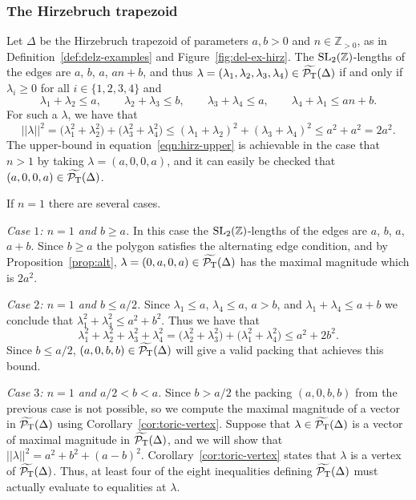\documentclass[10pt,a4paper]{amsart}
\numberwithin{equation}{section}
\def\Z{{\mathbb Z}}
\newcommand{\De}{\Delta}
\newcommand{\PT}{\mathcal{P}_{\rm T}}
\newcommand{\PTtilde}{\widetilde{\PT}}
\newcommand{\SL}{{\rm SL}_2(\Z)}
\theoremstyle{definition}
\theoremstyle{plain}
\theoremstyle{plain}
\begin{document}
\subsubsection{The Hirzebruch trapezoid}
\label{sec:hirz-packing}
Let $\De$ be the Hirzebruch trapezoid of parameters $a,b>0$ and $n\in \Z_{>0}$, as in Definition~\ref{def:delz-examples} and Figure~\ref{fig:del-ex-hirz}.
The $\SL$-lengths of the edges are $a$, $b$, $a$, $an+b$, and thus $\lambda = (\lambda_1,\lambda_2,\lambda_3,\lambda_4)\in\PTtilde(\De)$ if and only if $\lambda_i\geq 0$ for all $i\in\{1,2,3,4\}$ and
\begin{equation}\label{eqn:hirz-inequalities}
 \lambda_1+\lambda_2 \leq a,\qquad
 \lambda_2+\lambda_3 \leq b,\qquad
 \lambda_3+\lambda_4 \leq a,\qquad
 \lambda_4+\lambda_1 \leq an+b.
\end{equation}
For such a $\lambda$, we have that
\begin{equation}\label{eqn:hirz-upper}
 ||\lambda||^2 = \big(\lambda_1^2 + \lambda_2^2\big) + \big(\lambda_3^2 + \lambda_4^2\big) \leq (\lambda_1 + \lambda_2)^2 + (\lambda_3 + \lambda_4)^2 \leq a^2 + a^2 = 2a^2.
\end{equation}
The upper-bound in equation~\eqref{eqn:hirz-upper} is achievable in the case that $n>1$ by taking $\lambda = (a, 0, 0, a)$, and it can easily be checked that $(a,0,0,a)\in\PTtilde(\De)$.

If $n=1$ there are several cases.

{\it Case $1$: $n=1$ and $b\geq a$.} In this case the $\SL$-lengths of the edges are $a$, $b$, $a$, $a+b$. Since $b\geq a$ the polygon satisfies the alternating edge condition, and by Proposition~\ref{prop:alt}, $\lambda = (0,a,0,a)\in\PTtilde(\De)$ has the maximal magnitude which is $2a^2$.

{\it Case $2$: $n=1$ and $b\leq a/2$.} Since $\lambda_1\leq a$, $\lambda_4\leq a$, $a>b$, and $\lambda_1+\lambda_4\leq a+b$ we conclude that $\lambda_1^2+\lambda_4^2 \leq a^2 + b^2$.
Thus we have that
\[
 \lambda_1^2 + \lambda_2^2 + \lambda_3^2 + \lambda_4^2 = \big(\lambda_2^2 + \lambda_3^2\big) + \big(\lambda_1^2 + \lambda_4^2\big) \leq a^2 + 2b^2.
\]
Since $b\leq a/2$, $(a,0,b,b)\in\PTtilde(\De)$ will give a valid packing that achieves this bound.

{\it Case $3$: $n=1$ and $a/2 < b < a$.} Since $b>a/2$ the packing $(a,0,b,b)$ from the previous case is not possible, so we compute the maximal magnitude of a vector in $\PTtilde(\De)$ using Corollary~\ref{cor:toric-vertex}. Suppose that $\lambda\in\PTtilde(\De)$ is a vector of maximal magnitude in $\PTtilde(\De)$, and we will show that $||\lambda||^2 = a^2+b^2+(a-b)^2$. Corollary~\ref{cor:toric-vertex} states that $\lambda$ is a vertex of $\PTtilde(\De)$. Thus, at least four of the eight inequalities defining $\PTtilde(\De)$ must actually evaluate to equalities at $\lambda$.
\end{document}
